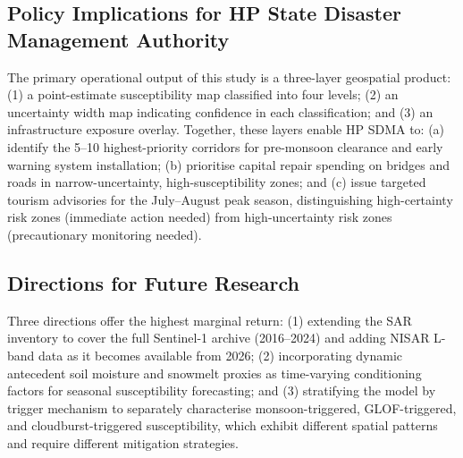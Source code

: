 \subsection*{Policy Implications for HP State Disaster Management Authority}

The primary operational output of this study is a three-layer geospatial product:
(1) a point-estimate susceptibility map classified into four levels;
(2) an uncertainty width map indicating confidence in each classification;
and (3) an infrastructure exposure overlay.
Together, these layers enable HP SDMA to:
(a) identify the 5--10 highest-priority corridors for pre-monsoon clearance
    and early warning system installation;
(b) prioritise capital repair spending on bridges and roads in
    narrow-uncertainty, high-susceptibility zones; and
(c) issue targeted tourism advisories for the July--August peak season,
    distinguishing high-certainty risk zones (immediate action needed)
    from high-uncertainty risk zones (precautionary monitoring needed).

\subsection*{Directions for Future Research}

Three directions offer the highest marginal return:
(1) extending the SAR inventory to cover the full Sentinel-1 archive (2016--2024)
and adding NISAR L-band data as it becomes available from 2026;
(2) incorporating dynamic antecedent soil moisture and snowmelt proxies
as time-varying conditioning factors for seasonal susceptibility forecasting;
and (3) stratifying the model by trigger mechanism to separately characterise
monsoon-triggered, GLOF-triggered, and cloudburst-triggered susceptibility,
which exhibit different spatial patterns and require different mitigation strategies.
